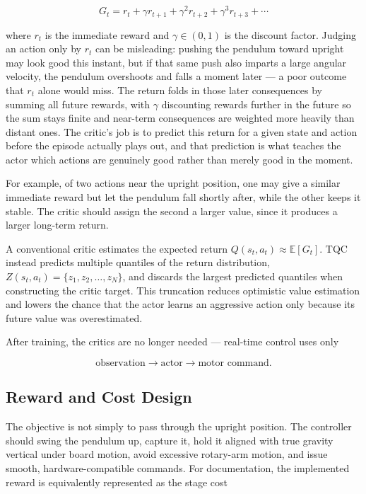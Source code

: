\documentclass[9pt]{extarticle}
\begin{document}
\begin{equation}
\boxed{
G_t =
r_t
+
\gamma r_{t+1}
+
\gamma^2 r_{t+2}
+
\gamma^3 r_{t+3}
+\cdots
}
\label{eq:return}
\end{equation}

where $r_t$ is the immediate reward and $\gamma\in(0,1)$ is the discount
factor. Judging an action only by $r_t$ can be misleading: pushing the
pendulum toward upright may look good this instant, but if that same push
also imparts a large angular velocity, the pendulum overshoots and falls a
moment later — a poor outcome that $r_t$ alone would miss. The return
folds in those later consequences by summing all future rewards, with
$\gamma$ discounting rewards further in the future so the sum stays finite
and near-term consequences are weighted more heavily than distant ones.
The critic's job is to predict this return for a given state and action
before the episode actually plays out, and that prediction is what teaches
the actor which actions are genuinely good rather than merely good in the
moment.

For example, of two actions near the upright position, one may give a
similar immediate reward but let the pendulum fall shortly after, while the
other keeps it stable. The critic should assign the second a larger value,
since it produces a larger long-term return.

A conventional critic estimates the expected return
$Q(s_t,a_t) \approx \mathbb{E}[G_t]$. TQC instead predicts multiple
quantiles of the return distribution,
$Z(s_t,a_t) = \{z_1,z_2,\ldots,z_N\}$, and discards the largest predicted
quantiles when constructing the critic target. This truncation reduces
optimistic value estimation and lowers the chance that the actor learns an
aggressive action only because its future value was overestimated.

After training, the critics are no longer needed — real-time control uses
only

\begin{equation}
\boxed{
\text{observation}
\longrightarrow
\text{actor}
\longrightarrow
\text{motor command}.
}
\end{equation}


\subsection{Reward and Cost Design}

The objective is not simply to pass through the upright position. The
controller should swing the pendulum up, capture it, hold it aligned with
true gravity vertical under board motion, avoid excessive rotary-arm
motion, and issue smooth, hardware-compatible commands. For documentation,
the implemented reward is equivalently represented as the stage cost
\end{document}
